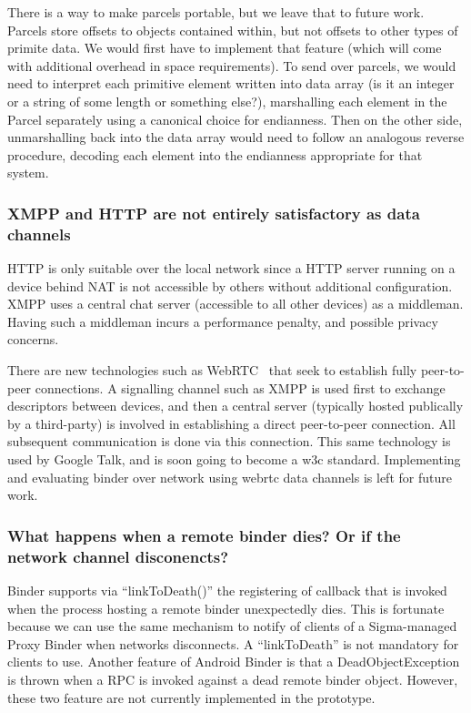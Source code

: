 \documentclass[prodmode]{acmlarge}
\begin{document}
There is a way to make parcels portable, but we leave that to future work. Parcels store offsets to objects contained within, but not offsets to other types of primite data. We would first have to implement that feature (which will come with additional overhead in space requirements). To send over parcels, we would need to interpret each primitive element written into data array (is it an integer or a string of some length or something else?), marshalling each element in the Parcel separately using a canonical choice for endianness. Then on the other side, unmarshalling back into the data array would need to follow an analogous reverse procedure, decoding each element into the endianness appropriate for that system.

\subsubsection{XMPP and HTTP are not entirely satisfactory as data channels}
HTTP is only suitable over the local network since a HTTP server running on a device behind NAT is not accessible by others without additional configuration. XMPP uses a central chat server (accessible to all other devices) as a middleman. Having such a middleman incurs a performance penalty, and possible privacy concerns.

There are new technologies such as WebRTC~\cite{GoogleTalkLibrary} that seek to establish fully peer-to-peer connections. A signalling channel such as XMPP is used first to exchange descriptors between devices, and then a central server (typically hosted publically by a third-party) is involved in establishing a direct peer-to-peer connection. All subsequent communication is done via this connection. This same technology is used by Google Talk, and is soon going to become a w3c standard. Implementing and evaluating binder over network using webrtc data channels is left for future work.

\subsubsection{What happens when a remote binder dies? Or if the network channel disconencts?}
Binder supports via ``linkToDeath()'' the registering of callback that is invoked when the process hosting a remote binder unexpectedly dies. This is fortunate because we can use the same mechanism to notify of clients of a Sigma-managed Proxy Binder when networks disconnects. A ``linkToDeath'' is not mandatory for clients to use. Another feature of Android Binder is that a DeadObjectException is thrown when a RPC is invoked against a dead remote binder object. However, these two feature are not currently implemented in the prototype.
\end{document}
